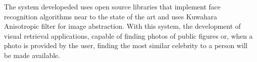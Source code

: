 The system developeded uses open source libraries that implement face recognition algorithms near to the state of the art and uses Kuwahara Anisotropic filter for image abstraction. With this system, the development of visual retrieval applications, capable of finding photos of public figures or, when a photo is provided by the user, finding the most similar celebrity to a person will be made available.